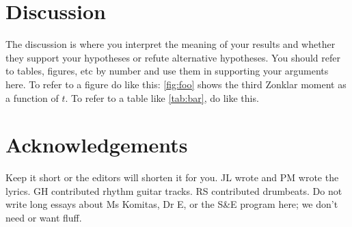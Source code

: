 \documentclass[amsmath,amssymb,aps,endfloats,linenumbers]{revtex4-2}
\begin{document}
    
    
    
    
\section{Discussion}
The discussion is where you interpret the meaning of your results and whether they support your hypotheses or refute alternative hypotheses. You should refer to tables, figures, etc by number and use them in supporting your arguments here. To refer to a figure do like this: \cref{fig:foo} shows the third Zonklar moment as a function of $t$. To refer to a table like \cref{tab:bar}, do like this. 

    
    
    
    
    
    
    
\section{Acknowledgements}
Keep it short or the editors will shorten it for you. JL wrote and PM wrote the lyrics. GH contributed rhythm guitar tracks. RS contributed drumbeats. Do not write long essays about Ms Komitas, Dr E, or the S\&E program here; we don't need or want fluff. 










%
%
%
\end{document}
